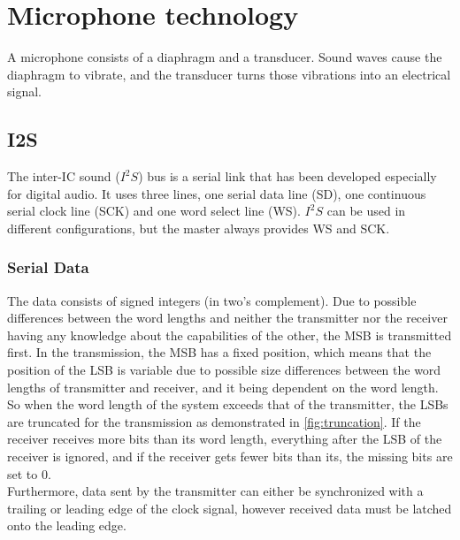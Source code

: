 \section{Microphone technology}

A microphone consists of a diaphragm and a transducer.
Sound waves cause the diaphragm to vibrate, and
the transducer turns those vibrations into an electrical signal.

\subsection{I2S}

The inter-IC sound ($I^2S$) \cite{i2s} bus is a serial link that has been developed especially for digital audio.
It uses three lines, one serial data line (SD), one continuous serial clock line (SCK) and one word select line (WS).
$I^2S$ can be used in different configurations, but the master always provides WS and SCK.

\subsubsection{Serial Data}

The data consists of signed integers (in two's complement).
Due to possible differences between the word lengths and neither the transmitter nor the
receiver having any knowledge about the capabilities of the other, the MSB is transmitted first.
In the transmission, the MSB has a fixed position, which means that the position of the LSB
is variable due to possible size differences between the word lengths of transmitter and receiver,
and it being dependent on the word length.\\
So when the word length of the system exceeds that of the transmitter, the LSBs are truncated
for the transmission as demonstrated in \ref{fig:truncation}.
If the receiver receives more bits than its word length, everything after the LSB
of the receiver is ignored, and if the receiver gets fewer bits than its,
the missing bits are set to 0.\\
Furthermore, data sent by the transmitter can either be synchronized with a trailing or leading edge
of the clock signal, however received data must be latched onto the leading edge.


